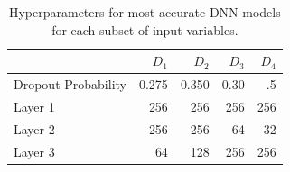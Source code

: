 \def\year{2017}\relax \documentclass[letterpaper]{article}
\begin{document}
\begin{table}
\begin{tabularx}{\linewidth}{l r r r r}
		\toprule[.2em]
		 &{\bf $D_1$}& {\bf $D_2$}&{\bf $D_3$}&{\bf $D_4$}\\
		\midrule
		Dropout Probability&0.275&0.350& 0.30&.5\\
		Layer 1&256&256& 256&256\\
		Layer 2&256&256&64&32\\
		Layer 3&64&128&256&256\\
		\bottomrule[.2em]
	\end{tabularx}
	\caption{Hyperparameters for most accurate DNN models for each subset of input variables.} \label{tab:dnnhyper}
\end{table}
\end{document}
